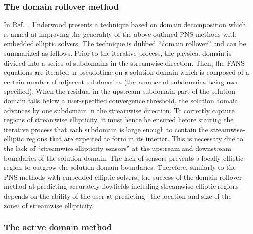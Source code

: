 \subsubsection{The domain rollover method}

In Ref.\ \cite{thesis:1997:underwood}, Underwood presents
a technique based on domain decomposition which is
aimed at improving the generality of the above-outlined PNS
methods with embedded elliptic solvers. The technique
is dubbed ``domain rollover'' and can be summarized as follows.
Prior to the iterative process, the physical domain is divided into a
series of subdomains in the streamwise
direction. Then, the FANS equations are iterated in
pseudotime on a solution domain which is
composed of a certain number of adjacent subdomains (the number of subdomains
being user-specified). When the residual
in the upstream subdomain part of the solution domain falls below a user-specified
convergence threshold, the solution domain advances by one subdomain in the
streamwise direction. To correctly capture regions of streamwise ellipticity,
it must hence be ensured before starting the iterative process that each
subdomain is large enough to contain the streamwise-elliptic regions
that are expected to form in its interior. This is necessary due to the lack
of ``streamwise ellipticity sensors'' at the upstream and downstream
boundaries of the solution domain. The lack of sensors prevents a locally elliptic
region to outgrow the solution domain boundaries. Therefore,
similarly to the PNS methods with embedded elliptic solvers,
the success of the domain rollover method at predicting accurately flowfields
including streamwise-elliptic regions depends on the ability of the user
at predicting \apriori\ the location and size of the zones of streamwise ellipticity.








\subsubsection{The active domain method}

